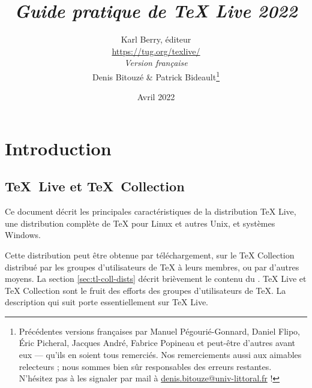 \documentclass[german, english, french]{article}
\renewcommand{\TL}{\TeX{} Live\xspace}%
\renewcommand{\TK}{\TeX{} Collection\xspace}%
\newcommand*\semail[1]{\href{mailto:#1}{#1}}
\begin{document}
\title{%
  \huge \emph{Guide pratique de \TL 2022}%
}

\author{
  Karl Berry, éditeur \\[3mm]
  \url{https://tug.org/texlive/} \\[6mm]
  \textit{Version française} \\[3mm]
  Denis Bitouzé \& Patrick Bideault\thanks{%
    Précédentes versions françaises par Manuel Pégourié-Gonnard, Daniel Flipo,
    Éric Picheral, Jacques André, Fabrice Popineau et peut-être d'autres avant
    eux --- qu'ils en soient tous remerciés. Nos remerciements aussi aux
    aimables relecteurs ; nous sommes bien sûr responsables des erreurs
    restantes. N'hésitez pas à les signaler par mail
    à \semail{denis.bitouze@univ-littoral.fr} !%
  }%
}


\date{Avril 2022}

\maketitle

\begin{multicols}{2}
  \tableofcontents
\end{multicols}

\section{Introduction}
\label{sec:intro}

\subsection{\protect\TeX\ Live et \protect\TeX\ Collection}

Ce document décrit les principales caractéristiques de la distribution \TL{},
une distribution complète de \TeX{} pour Linux et autres Unix, \MacOSX{} et
systèmes Windows.

Cette distribution peut être obtenue par téléchargement, sur le \DVD{} \TK{}
distribué par les groupes d'utilisateurs de \TeX{} à leurs membres, ou par
d'autres moyens.  La section \ref{sec:tl-coll-dists} décrit brièvement le
contenu du \DVD.  \TL{} et \TK{} sont le fruit des efforts des groupes
d'utilisateurs de \TeX. La description qui suit porte essentiellement sur \TL{}.
\end{document}
